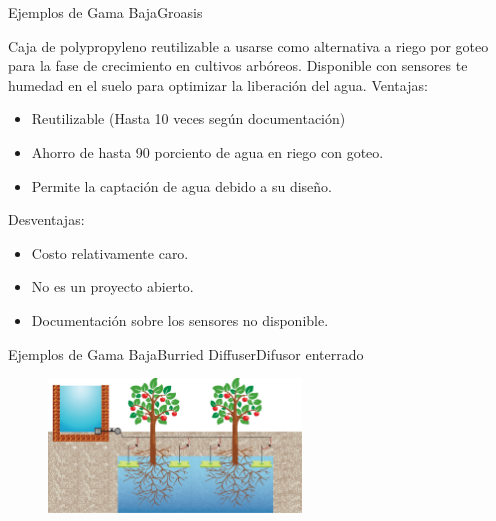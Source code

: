 \documentclass[]{beamer}
\begin{document}
\begin{frame}{Ejemplos de Gama Baja}{Groasis}

Caja de polypropyleno reutilizable a usarse como alternativa a riego por goteo para la fase de crecimiento en cultivos arbóreos. Disponible con sensores te humedad en el suelo para optimizar la liberación del agua.
  Ventajas:
  \begin{itemize}
    \item Reutilizable (Hasta 10 veces según documentación)
    \item Ahorro de hasta 90 porciento de agua en riego con goteo.
    \item Permite la captación de agua debido a su diseño.
  \end{itemize}

  Desventajas:
  \begin{itemize}
    \item Costo relativamente caro.
    \item No es un proyecto abierto.
    \item Documentación sobre los sensores no disponible.
  \end{itemize}
\end{frame}


\begin{frame}{Ejemplos de Gama Baja}{Burried Diffuser}{Difusor enterrado}
  \begin{figure}
    \includegraphics[width=0.6\textwidth]{Docs/bd1}
  \end{figure}

\end{frame}
\end{document}
